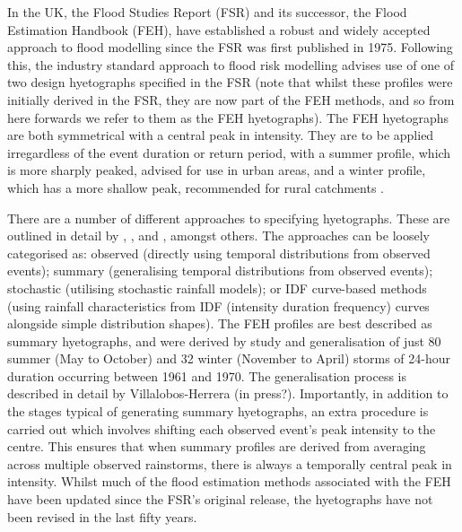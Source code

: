 \documentclass[APA,Times2COL]{WileyNJDv5}
\begin{document}
In the UK, the Flood Studies Report (FSR) and its successor, the Flood Estimation Handbook (FEH), have established a robust and widely accepted approach to flood modelling since the FSR was first published in 1975. Following this, the industry standard approach to flood risk modelling advises use of one of two design hyetographs specified in the FSR (note that whilst these profiles were initially derived in the FSR, they are now part of the FEH methods, and so from here forwards we refer to them as the FEH hyetographs). The FEH hyetographs are both symmetrical with a central peak in intensity. They are to be applied irregardless of the event duration or return period, with a summer profile, which is more sharply peaked, advised for use in urban areas, and a winter profile, which has a more shallow peak, recommended for rural catchments \citep{faulkner1999}. 

There are a number of different approaches to specifying hyetographs. These are outlined in detail by \citet{chow1988applied}, \citet{veneziano1999best}, and \citet{balbastre2019comparison}, amongst others. The approaches can be loosely categorised as: observed (directly using temporal distributions from observed events); summary (generalising temporal distributions from observed events); stochastic (utilising stochastic rainfall models); or IDF curve-based methods (using rainfall characteristics from IDF (intensity duration frequency) curves alongside simple distribution shapes). The FEH profiles are best described as summary hyetographs, and were derived by study and generalisation of just 80 summer (May to October) and 32 winter (November to April) storms of 24-hour duration occurring between 1961 and 1970. The generalisation process is described in detail by Villalobos-Herrera (in press?). Importantly, in addition to the stages typical of generating summary hyetographs, an extra procedure is carried out which involves shifting each observed event's peak intensity to the centre. This ensures that when summary profiles are derived from averaging across multiple observed rainstorms, there is always a temporally central peak in intensity. Whilst much of the flood estimation methods associated with the FEH have been updated since the FSR's original release, the hyetographs have not been revised in the last fifty years. 

\end{document}
